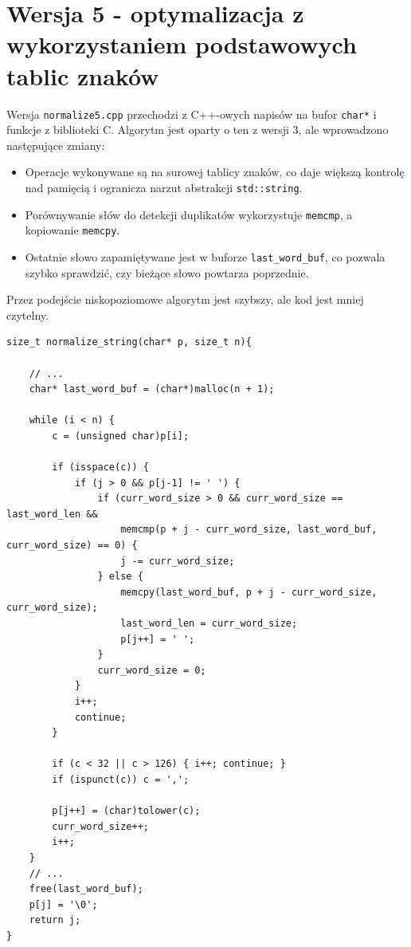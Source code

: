\documentclass{article}
\begin{document}
\section{Wersja 5 - optymalizacja z wykorzystaniem podstawowych tablic znaków}
Wersja \texttt{normalize5.cpp} przechodzi z C++-owych napisów na bufor \texttt{char*} i funkcje z biblioteki C. Algorytm jest oparty o ten z wersji 3, ale wprowadzono następujące zmiany:
\begin{itemize}
    \item Operacje wykonywane są na surowej tablicy znaków, co daje większą kontrolę nad pamięcią i ogranicza narzut abstrakcji \texttt{std::string}.
    \item Porównywanie słów do detekcji duplikatów wykorzystuje \texttt{memcmp}, a kopiowanie \texttt{memcpy}.
    \item Ostatnie słowo zapamiętywane jest w buforze \texttt{last\_word\_buf}, co pozwala szybko sprawdzić, czy bieżące słowo powtarza poprzednie.
\end{itemize}
Przez podejście niskopoziomowe algorytm jest szybszy, ale kod jest mniej czytelny.
\newpage
\begin{lstlisting}[caption={Kluczowy fragment funkcji \texttt{normalize\_string} w wersji 5}]
size_t normalize_string(char* p, size_t n){

    // ...
    char* last_word_buf = (char*)malloc(n + 1);

    while (i < n) {
        c = (unsigned char)p[i];

        if (isspace(c)) {
            if (j > 0 && p[j-1] != ' ') {
                if (curr_word_size > 0 && curr_word_size == last_word_len &&
                    memcmp(p + j - curr_word_size, last_word_buf, curr_word_size) == 0) {
                    j -= curr_word_size;
                } else {
                    memcpy(last_word_buf, p + j - curr_word_size, curr_word_size);
                    last_word_len = curr_word_size;
                    p[j++] = ' '; 
                }
                curr_word_size = 0;
            }
            i++;
            continue;
        }

        if (c < 32 || c > 126) { i++; continue; }
        if (ispunct(c)) c = ',';

        p[j++] = (char)tolower(c);
        curr_word_size++;
        i++;
    }
    // ...
    free(last_word_buf);
    p[j] = '\0';
    return j;
}

\end{lstlisting}
\newpage
\end{document}
